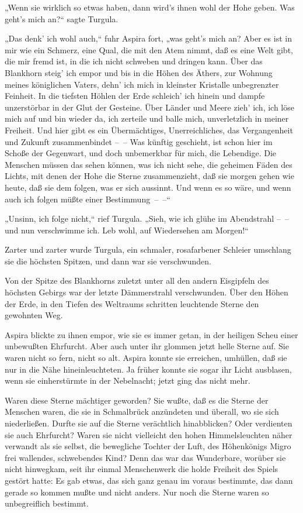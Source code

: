 „Wenn sie wirklich so etwas haben, dann wird's ihnen wohl der Hohe
geben. Was geht's mich an?“ sagte Turgula.

„Das denk' ich wohl auch,“ fuhr Aspira fort, „was geht's mich an?
Aber es ist in mir wie ein Schmerz, eine Qual, die mit den Atem
nimmt, daß es eine Welt gibt, die mir fremd ist, in die ich nicht
schweben und dringen kann. Über das Blankhorn steig' ich empor und
bis in die Höhen des Äthers, zur Wohnung meines königlichen Vaters,
dehn' ich mich in kleinster Kristalle unbegrenzter Feinheit. In die
tiefsten Höhlen der Erde schleich' ich hinein und dampfe
unzerstörbar in der Glut der Gesteine. Über Länder und Meere zieh'
ich, ich löse mich auf und bin wieder da, ich zerteile und balle
mich, unverletzlich in meiner Freiheit. Und hier gibt es ein
Übermächtiges, Unerreichliches, das Vergangenheit und Zukunft
zusammenbindet –~– Was künftig geschieht, ist schon hier im Schoße
der Gegenwart, und doch unbemerkbar für mich, die Lebendige. Die
Menschen müssen das sehen können, was ich nicht sehe, die geheimen
Fäden des Lichts, mit denen der Hohe die Sterne zusammenzieht, daß
sie morgen gehen wie heute, daß sie dem folgen, was er sich
aussinnt. Und wenn es so wäre, und wenn auch ich folgen müßte einer
Bestimmung~–~–“

„Unsinn, ich folge nicht,“ rief Turgula. „Sieh, wie ich glühe im
Abendstrahl –~– und nun verschwimme ich. Leb wohl, auf Wiedersehen
am Morgen!“

Zarter und zarter wurde Turgula, ein schmaler, rosafarbener
Schleier umschlang sie die höchsten Spitzen, und dann war sie
verschwunden.

Von der Spitze des Blankhorns zuletzt unter all den andern
Eisgipfeln des höchsten Gebirgs war der letzte Dämmerstrahl
verschwunden. Über den Höhen der Erde, in den Tiefen des Weltraums
schritten leuchtende Sterne den gewohnten Weg.

Aspira blickte zu ihnen empor, wie sie es immer getan, in der
heiligen Scheu einer unbewußten Ehrfurcht. Aber auch unter ihr
glommen jetzt helle Sterne auf. Sie waren nicht so fern, nicht so
alt. Aspira konnte sie erreichen, umhüllen, daß sie nur in die Nähe
hineinleuchteten. Ja früher konnte sie sogar ihr Licht ausblasen,
wenn sie einherstürmte in der Nebelnacht; jetzt ging das nicht
mehr.

Waren diese Sterne mächtiger geworden? Sie wußte, daß es die Sterne
der Menschen waren, die sie in Schmalbrück anzündeten und überall,
wo sie sich niederließen. Durfte sie auf die Sterne verächtlich
hinabblicken? Oder verdienten sie auch Ehrfurcht? Waren sie nicht
vielleicht den hohen Himmelsleuchten näher verwandt als sie selbst,
die bewegliche Tochter der Luft, des Höhenkönigs Migro frei
wallendes, schwebendes Kind? Denn das war das Wunderbare, worüber
sie nicht hinwegkam, seit ihr einmal Menschenwerk die holde
Freiheit des Spiels gestört hatte: Es gab etwas, das sich ganz
genau im voraus bestimmte, das dann gerade so kommen mußte und
nicht anders. Nur noch die Sterne waren so unbegreiflich bestimmt.

